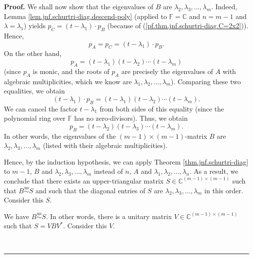 \documentclass[numbers=enddot,12pt,final,onecolumn,notitlepage]{scrartcl}%
\numberwithin{exer}{subsection}
\theoremstyle{definition}
\newenvironment{proof}[1][Proof]{\noindent\textbf{#1.} }{\ \rule{0.5em}{0.5em}}
\begin{document}
\begin{proof}
We shall now show that the eigenvalues of $B$ are $\lambda_{2},\lambda
_{3},\ldots,\lambda_{m}$. Indeed, Lemma
\ref{lem.jnf.schurtri-diag.descend-poly} (applied to $\mathbb{F}=\mathbb{C}$
and $n=m-1$ and $\lambda=\lambda_{1}$) yields $p_{C}=\left(  t-\lambda
_{1}\right)  \cdot p_{B}$ (because of (\ref{pf.thm.jnf.schurtri-diag.C=2x2})).
Hence,%
\[
p_{A}=p_{C}=\left(  t-\lambda_{1}\right)  \cdot p_{B}.
\]
On the other hand,%
\[
p_{A}=\left(  t-\lambda_{1}\right)  \left(  t-\lambda_{2}\right)
\cdots\left(  t-\lambda_{m}\right)
\]
(since $p_{A}$ is monic, and the roots of $p_{A}$ are precisely the
eigenvalues of $A$ with algebraic multiplicities, which we know are
$\lambda_{1},\lambda_{2},\ldots,\lambda_{m}$). Comparing these two equalities,
we obtain%
\[
\left(  t-\lambda_{1}\right)  \cdot p_{B}=\left(  t-\lambda_{1}\right)
\left(  t-\lambda_{2}\right)  \cdots\left(  t-\lambda_{m}\right)  .
\]
We can cancel the factor $t-\lambda_{1}$ from both sides of this equality
(since the polynomial ring over $\mathbb{F}$ has no zero-divisors). Thus, we
obtain%
\[
p_{B}=\left(  t-\lambda_{2}\right)  \left(  t-\lambda_{3}\right)
\cdots\left(  t-\lambda_{m}\right)  .
\]
In other words, the eigenvalues of the $\left(  m-1\right)  \times\left(
m-1\right)  $-matrix $B$ are $\lambda_{2},\lambda_{3},\ldots,\lambda_{m}$
(listed with their algebraic multiplicities).

Hence, by the induction hypothesis, we can apply Theorem
\ref{thm.jnf.schurtri-diag} to $m-1$, $B$ and $\lambda_{2},\lambda_{3}%
,\ldots,\lambda_{m}$ instead of $n$, $A$ and $\lambda_{1},\lambda_{2}%
,\ldots,\lambda_{n}$. As a result, we conclude that there exists an
upper-triangular matrix $S\in\mathbb{C}^{\left(  m-1\right)  \times\left(
m-1\right)  }$ such that $B\overset{\operatorname*{us}}{\sim}S$ and such that
the diagonal entries of $S$ are $\lambda_{2},\lambda_{3},\ldots,\lambda_{m}$
in this order. Consider this $S$.

We have $B\overset{\operatorname*{us}}{\sim}S$. In other words, there is a
unitary matrix $V\in\mathbb{C}^{\left(  m-1\right)  \times\left(  m-1\right)
}$ such that $S=VBV^{\ast}$. Consider this $V$.


\end{proof}
\end{document}
